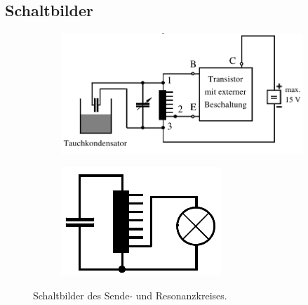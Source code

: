 \documentclass[10pt,a4paper]{article}
\begin{document}
\subsection{Schaltbilder}
\begin{flushleft}
\begin{figure}[H]
\centering
\begin{subfigure}[t]{.5\textwidth}
\centering
\includegraphics[scale=0.4]{schalt_sendkreis}
\label{fig:schalt_sender}
\end{subfigure}%
%
\begin{subfigure}[t]{.5\textwidth}
\centering
\includegraphics[scale=0.4]{schalt_reskreis}
\label{fig:schalt_resonanz}
\end{subfigure}%
\caption{Schaltbilder des Sende- und Resonanzkreises.\protect{}}
\label{fig:schalts}
\end{figure}


\end{flushleft}
\end{document}
